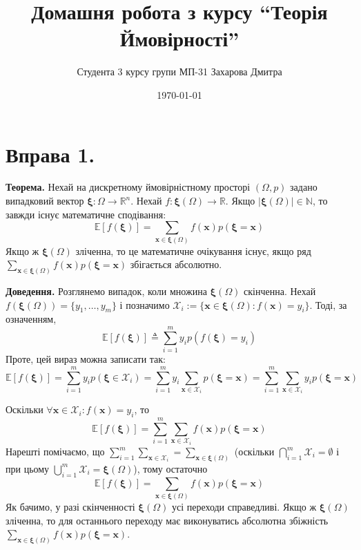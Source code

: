 \documentclass[14pt]{extarticle}
\title{Домашня робота з курсу ``Теорія Ймовірності''}
\author{Студента 3 курсу групи МП-31 Захарова Дмитра}
\date{\today}
\begin{document}
\maketitle
\section*{Вправа 1.}

\textbf{Теорема.} Нехай на дискретному ймовірністному просторі $(\Omega,p)$ задано випадковий вектор $\boldsymbol{\xi}: \Omega \to \mathbb{R}^n$. Нехай $f:\boldsymbol{\xi}(\Omega) \to \mathbb{R}$. Якщо $|\boldsymbol{\xi}(\Omega)| \in \mathbb{N}$, то завжди існує математичне сподівання:
\[
\mathbb{E}[f(\boldsymbol{\xi})] = \sum_{\boldsymbol{x} \in \boldsymbol{\xi}(\Omega)} f(\boldsymbol{x})p(\boldsymbol{\xi} = \boldsymbol{x})
\]
Якщо ж $\boldsymbol{\xi}(\Omega)$ зліченна, то це математичне очікування існує, якщо ряд $\sum_{\boldsymbol{x} \in \boldsymbol{\xi}(\Omega)} f(\boldsymbol{x})p(\boldsymbol{\xi}=\boldsymbol{x})$ збігається абсолютно.

\textbf{Доведення.} Розглянемо випадок, коли множина $\boldsymbol{\xi}(\Omega)$ скінченна. Нехай $f(\boldsymbol{\xi}(\Omega)) = \{y_1,\dots,y_m\}$ і позначимо $\mathcal{X}_i := \{\boldsymbol{x} \in \boldsymbol{\xi}(\Omega): f(\boldsymbol{x}) = y_i\}$. Тоді, за означенням,
\[
\mathbb{E}[f(\boldsymbol{\xi})] \triangleq \sum_{i=1}^m y_i p(f(\boldsymbol{\xi}) = y_i)
\]
Проте, цей вираз можна записати так:
\[
\mathbb{E}[f(\boldsymbol{\xi})] = \sum_{i=1}^m y_i p (\boldsymbol{\xi} \in \mathcal{X}_i) = \sum_{i=1}^m y_i \sum_{\boldsymbol{x} \in \mathcal{X}_i}p(\boldsymbol{\xi} = \boldsymbol{x}) = \sum_{i=1}^m \sum_{\boldsymbol{x} \in \mathcal{X}_i} y_i p(\boldsymbol{\xi}=\boldsymbol{x})
\]

Оскільки $\forall \boldsymbol{x} \in \mathcal{X}_i: f(\boldsymbol{x}) = y_i$, то
\[
\mathbb{E}[f(\boldsymbol{\xi})] = \sum_{i=1}^m \sum_{\boldsymbol{x} \in \mathcal{X}_i} f(\boldsymbol{x})p(\boldsymbol{\xi}=\boldsymbol{x})
\]
Нарешті помічаємо, що $\sum_{i=1}^m\sum_{\boldsymbol{x} \in \mathcal{X}_i} = \sum_{\boldsymbol{x} \in \boldsymbol{\xi}(\Omega)}$ (оскільки $\bigcap_{i=1}^m \mathcal{X}_i = \emptyset$ і при цьому $\bigcup_{i=1}^m \mathcal{X}_i=\boldsymbol{\xi}(\Omega)$), тому остаточно
\[
\mathbb{E}[f(\boldsymbol{\xi})] = \sum_{\boldsymbol{x} \in \boldsymbol{\xi}(\Omega)} f(\boldsymbol{x})p(\boldsymbol{\xi}=\boldsymbol{x})
\]
Як бачимо, у разі скінченності $\boldsymbol{\xi}(\Omega)$ усі переходи справедливі. Якщо ж $\boldsymbol{\xi}(\Omega)$ зліченна, то для останнього переходу має виконуватись абсолютна збіжність $\sum_{\boldsymbol{x} \in \boldsymbol{\xi}(\Omega)} f(\boldsymbol{x})p(\boldsymbol{\xi}=\boldsymbol{x})$.
\end{document}
